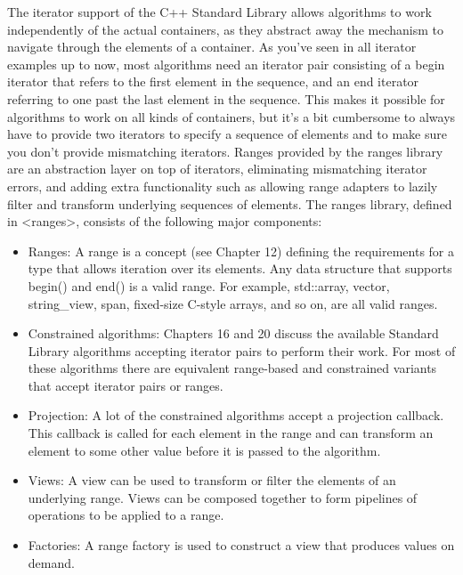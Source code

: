 

The iterator support of the C++ Standard Library allows algorithms to work independently of the actual containers, as they abstract away the mechanism to navigate through the elements of a container. As you’ve seen in all iterator examples up to now, most algorithms need an iterator pair consisting of a begin iterator that refers to the first element in the sequence, and an end iterator referring to one past the last element in the sequence. This makes it possible for algorithms to work on all kinds of containers, but it’s a bit cumbersome to always have to provide two iterators to specify a sequence of elements and to make sure you don’t provide mismatching iterators. Ranges provided by the ranges library are an abstraction layer on top of iterators, eliminating mismatching iterator errors, and adding extra functionality such as allowing range adapters to lazily filter and transform underlying sequences of elements. The ranges library, defined in <ranges>, consists of the following major components:

\begin{itemize}
\item
Ranges: A range is a concept (see Chapter 12) defining the requirements for a type that allows iteration over its elements. Any data structure that supports begin() and end() is a valid range. For example, std::array, vector, string\_view, span, fixed-size C-style arrays, and so on, are all valid ranges.

\item
Constrained algorithms: Chapters 16 and 20 discuss the available Standard Library algorithms accepting iterator pairs to perform their work. For most of these algorithms there are equivalent range-based and constrained variants that accept iterator pairs or ranges.

\item
Projection: A lot of the constrained algorithms accept a projection callback. This callback is called for each element in the range and can transform an element to some other value before it is passed to the algorithm.

\item
Views: A view can be used to transform or filter the elements of an underlying range. Views can be composed together to form pipelines of operations to be applied to a range.

\item
Factories: A range factory is used to construct a view that produces values on demand.
\end{itemize}

